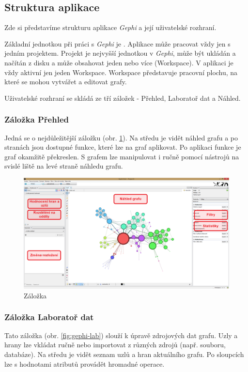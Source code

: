 \documentclass[thesis=M,czech]{FITthesis}[2014/05/6]
\begin{document}
\subsection{Struktura aplikace}
Zde si představíme strukturu aplikace \textit{Gephi} a její uživatelské rozhraní.

Základní jednotkou při práci s \textit{Gephi} je . Aplikace může pracovat vždy jen s jedním projektem. Projekt je nejvyšší jednotkou v \textit{Gephi}, může být ukládán a 
načítán z disku a může obsahovat jeden nebo více  (Workspace). V aplikaci je vždy aktivní jen jeden Workspace. Workspace představuje 
pracovní plochu, na které se mohou vytvářet a editovat grafy.
 
Uživatelské rozhraní se skládá ze tří záložek - Přehled, Laboratoř dat a Náhled.

\subsubsection{Záložka Přehled}
Jedná se o nejdůležitější záložku (obr. \ref{fig:gephi-overview}). Na středu je vidět náhled grafu a po stranách jsou dostupné funkce, které lze na graf aplikovat. Po
aplikaci funkce je graf okamžitě překreslen. S grafem lze manipulovat i ručně pomocí nástrojů na svislé liště na levé straně náhledu grafu.

\begin{figure}\centering
 	\includegraphics[width=1\textwidth]{images/gephi/gephi_overview_final}
 	\caption[Záložka ]{Záložka }\label{fig:gephi-overview}
\end{figure}

\subsubsection{Záložka Laboratoř dat}
Tato záložka (obr. \ref{fig:gephi-lab}) slouží k úpravě zdrojových dat grafu. Uzly a hrany lze vkládat ručně nebo importovat z různých zdrojů (např. souboru, databáze). Na středu je vidět
seznam uzlů a hran aktuálního grafu. Po sloupcích lze s hodnotami atributů provádět hromadné operace.
\end{document}
